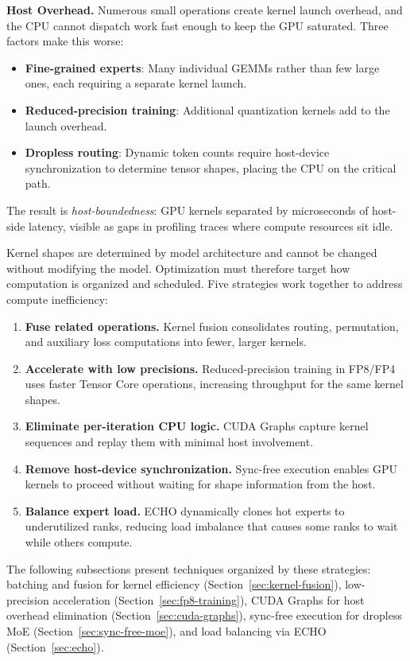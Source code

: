 \textbf{Host Overhead.} Numerous small operations create kernel launch overhead, and the CPU cannot dispatch work fast enough to keep the GPU saturated. Three factors make this worse:
\begin{itemize}
    \item \textbf{Fine-grained experts}: Many individual GEMMs rather than few large ones, each requiring a separate kernel launch.
    \item \textbf{Reduced-precision training}: Additional quantization kernels add to the launch overhead.
    \item \textbf{Dropless routing}: Dynamic token counts require host-device synchronization to determine tensor shapes, placing the CPU on the critical path.
\end{itemize}

The result is \textit{host-boundedness}: GPU kernels separated by microseconds of host-side latency, visible as gaps in profiling traces where compute resources sit idle.

Kernel shapes are determined by model architecture and cannot be changed without modifying the model. Optimization must therefore target how computation is organized and scheduled. Five strategies work together to address compute inefficiency:

\begin{enumerate}
    \item \textbf{Fuse related operations.} Kernel fusion consolidates routing, permutation, and auxiliary loss computations into fewer, larger kernels.
    \item \textbf{Accelerate with low precisions.} Reduced-precision training in FP8/FP4 uses faster Tensor Core operations, increasing throughput for the same kernel shapes.
    \item \textbf{Eliminate per-iteration CPU logic.} CUDA Graphs capture kernel sequences and replay them with minimal host involvement.
    \item \textbf{Remove host-device synchronization.} Sync-free execution enables GPU kernels to proceed without waiting for shape information from the host.
    \item \textbf{Balance expert load.} ECHO dynamically clones hot experts to underutilized ranks, reducing load imbalance that causes some ranks to wait while others compute.
\end{enumerate}

The following subsections present techniques organized by these strategies: batching and fusion for kernel efficiency (Section~\ref{sec:kernel-fusion}), low-precision acceleration (Section~\ref{sec:fp8-training}), CUDA Graphs for host overhead elimination (Section~\ref{sec:cuda-graphs}), sync-free execution for dropless MoE (Section~\ref{sec:sync-free-moe}), and load balancing via ECHO (Section~\ref{sec:echo}).

